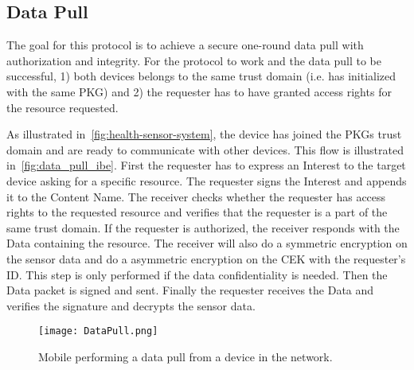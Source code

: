 



\subsection{Data Pull}\label{data_pull}
The goal for this protocol is to achieve a secure one-round data pull with authorization and integrity.
For the protocol to work and the data pull to be successful, 1) both devices belongs to the same trust domain (i.e. has initialized with the same \gls{PKG}) and 2) the requester has to have granted access rights for the resource requested.

As illustrated in~\autoref{fig:health-sensor-system}, the device has joined the \gls{PKG}s trust domain and are ready to communicate with other devices.
This flow is illustrated in~\autoref{fig:data_pull_ibe}.
First the requester has to express an Interest to the target device asking for a specific resource. 
The requester signs the Interest and appends it to the Content Name.
The receiver checks whether the requester has access rights to the requested resource and verifies that the requester is a part of the same trust domain.
If the requester is authorized, the receiver responds with the Data containing the resource. 
The receiver will also do a symmetric encryption on the sensor data and do a asymmetric encryption on the \gls{CEK} with the requester's \gls{ID}.
This step is only performed if the data confidentiality is needed. 
Then the Data packet is signed and sent.
Finally the requester receives the Data and verifies the signature and decrypts the sensor data.

\begin{figure}[ht]
  \centering
  \texttt{[image: DataPull.png]}
  \caption{Mobile performing a data pull from a device in the network.}
  \label{fig:data_pull_ibe}
\end{figure}

